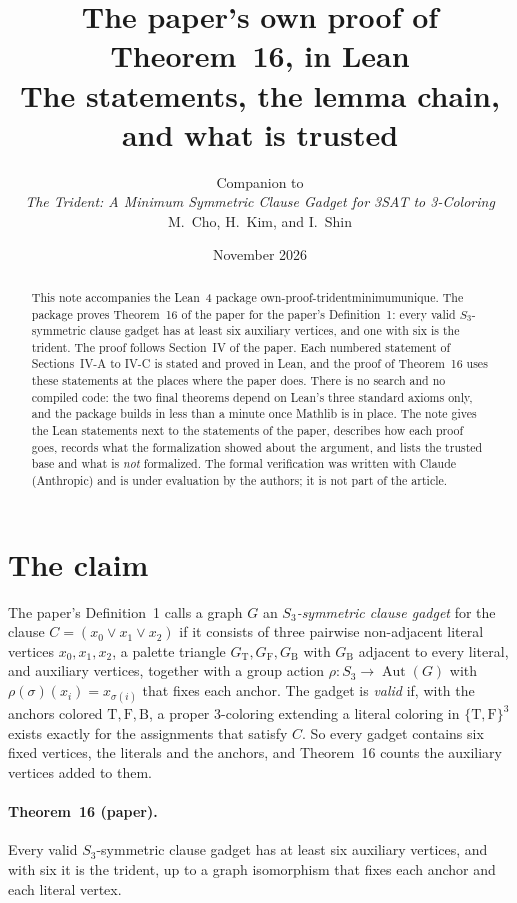 \documentclass[11pt,a4paper]{article}
\title{The paper's own proof of Theorem~16, in Lean\\[2pt]
\large The statements, the lemma chain, and what is trusted}
\author{Companion to\\ \emph{The Trident: A Minimum Symmetric Clause Gadget for 3SAT to 3-Coloring}\\
M.~Cho, H.~Kim, and I.~Shin}
\date{November 2026}
\newcommand{\leanus}{\textunderscore\allowbreak}
\newcommand{\lean}[1]{{\ttfamily\let\_\leanus #1}}
\newcommand{\GT}{G_{\mathrm{T}}}
\newcommand{\GF}{G_{\mathrm{F}}}
\newcommand{\GB}{G_{\mathrm{B}}}
\newcommand{\T}{\mathrm{T}}
\newcommand{\F}{\mathrm{F}}
\newcommand{\B}{\mathrm{B}}
\begin{document}
\maketitle

\begin{abstract}
\noindent
This note accompanies the Lean~4 package
\lean{own-proof-trident\_minimum\_unique}. The package proves Theorem~16 of
the paper for the paper's Definition~1: every valid $S_3$-symmetric clause
gadget has at least six auxiliary vertices, and one with six is the trident.
The proof follows Section~IV of the paper. Each numbered statement of
Sections~IV-A to IV-C is stated and proved in Lean, and the proof of
Theorem~16 uses these statements at the places where the paper does. There is no search and no
compiled code: the two final theorems depend on Lean's three standard axioms
only, and the package builds in less than a minute once Mathlib is in place.
The note gives the Lean statements next to the statements of the paper,
describes how each proof goes, records what the formalization showed about
the argument, and lists the trusted base and what is \emph{not} formalized.
The formal verification was written with Claude (Anthropic) and is under
evaluation by the authors; it is not part of the article.
\end{abstract}

\tableofcontents

\section{The claim}\label{sec:claim}

The paper's Definition~1 calls a graph $G$ an \emph{$S_3$-symmetric clause
gadget} for the clause $C=(x_0\lor x_1\lor x_2)$ if it consists of three
pairwise non-adjacent literal vertices $x_0,x_1,x_2$, a palette triangle
$\GT,\GF,\GB$ with $\GB$ adjacent to every literal, and auxiliary vertices,
together with a group action $\rho:S_3\to\operatorname{Aut}(G)$ with
$\rho(\sigma)(x_i)=x_{\sigma(i)}$ that fixes each anchor. The gadget is
\emph{valid} if, with the anchors colored $\T,\F,\B$, a proper 3-coloring
extending a literal coloring in $\{\T,\F\}^3$ exists exactly for the
assignments that satisfy $C$. So every gadget contains six fixed vertices,
the literals and the anchors, and Theorem~16 counts the auxiliary vertices
added to them.

\paragraph{Theorem~16 (paper).} Every valid $S_3$-symmetric clause gadget has
at least six auxiliary vertices, and with six it is the trident, up to a graph
isomorphism that fixes each anchor and each literal vertex.
\end{document}
